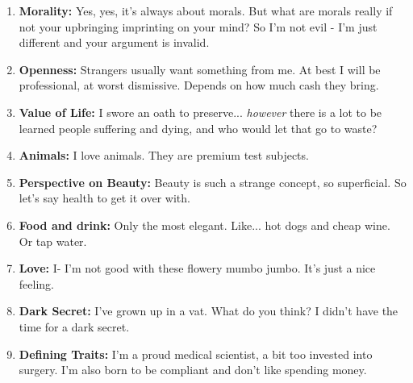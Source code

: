 \begin{enumerate}
		He probably has some control mechanism left in place and the feeling won't let me go.
	\item
		\textbf{Morality:}
		Yes, yes, it's always about morals.
		But what are morals really if not your upbringing imprinting on your mind?
		So I'm not evil - I'm just different and your argument is invalid.
	\item
		\textbf{Openness:}
		Strangers usually want something from me.
		At best I will be professional, at worst dismissive.
		Depends on how much cash they bring.
	\item
		\textbf{Value of Life:}
		I swore an oath to preserve...
		\textit{however} there is a lot to be learned people suffering and dying,
		and who would let that go to waste?
	\item
		\textbf{Animals:}
		I love animals.
		They are premium test subjects.
	\item
		\textbf{Perspective on Beauty:}
		Beauty is such a strange concept, so superficial.
		So let's say health to get it over with.
	\item
		\textbf{Food and drink:}
		Only the most elegant.
		Like... hot dogs and cheap wine.
		Or tap water.
	\item
		\textbf{Love:}
		I- I'm not good with these flowery mumbo jumbo.
		It's just a nice feeling.
	\item
		\textbf{Dark Secret:}
		I've grown up in a vat.
		What do you think?
		I didn't have the time for a dark secret.
	\item
		\textbf{Defining Traits:}
		I'm a proud medical scientist,
		a bit too invested into surgery.
		I'm also born to be compliant and don't like spending money.
\end{enumerate}

